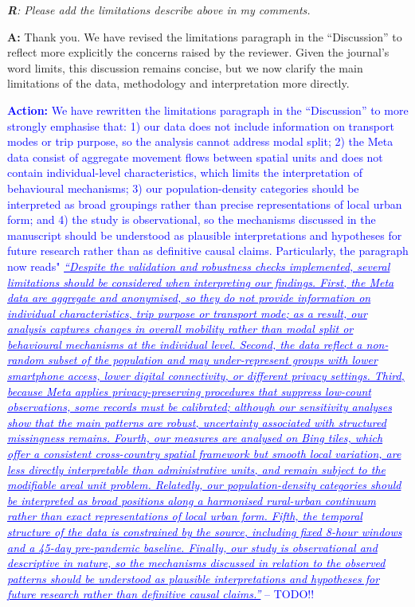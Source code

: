 \documentclass[12pt,a4paper,oneside, reqno]{amsart}
\begin{document}
\setlength{\leftskip}{1cm} \textit{\textbf{R}: Please add the limitations describe above in my comments.}

\setlength{\leftskip}{1cm}\textbf{A:} Thank you. We have revised the limitations paragraph in the ``Discussion'' to reflect more explicitly the concerns raised by the reviewer. Given the journal’s word limits, this discussion remains concise, but we now clarify the main limitations of the data, methodology and interpretation more directly.

\textcolor{blue}{\textbf{Action:} We have rewritten the limitations paragraph in the ``Discussion'' to more strongly emphasise that: 1) our data does not include information on transport modes or trip purpose, so the analysis cannot address modal split; 2) the Meta data consist of aggregate movement flows between spatial units and does not contain individual-level characteristics, which limits the interpretation of behavioural mechanisms; 3) our population-density categories should be interpreted as broad groupings rather than precise representations of local urban form; and 4) the study is observational, so the mechanisms discussed in the manuscript should be understood as plausible interpretations and hypotheses for future research rather than as definitive causal claims. Particularly, the paragraph now reads" \textit{\ul{``Despite the validation and robustness checks implemented, several limitations should be considered when interpreting our findings. First, the Meta data are aggregate and anonymised, so they do not provide information on individual characteristics, trip purpose or transport mode; as a result, our analysis captures changes in overall mobility rather than modal split or behavioural mechanisms at the individual level. Second, the data reflect a non-random subset of the population and may under-represent groups with lower smartphone access, lower digital connectivity, or different privacy settings. Third, because Meta applies privacy-preserving procedures that suppress low-count observations, some records must be calibrated; although our sensitivity analyses show that the main patterns are robust, uncertainty associated with structured missingness remains. Fourth, our measures are analysed on Bing tiles, which offer a consistent cross-country spatial framework but smooth local variation, are less directly interpretable than administrative units, and remain subject to the modifiable areal unit problem. Relatedly, our population-density categories should be interpreted as broad positions along a harmonised rural-urban continuum rather than exact representations of local urban form. Fifth, the temporal structure of the data is constrained by the source, including fixed 8-hour windows and a 45-day pre-pandemic baseline. Finally, our study is observational and descriptive in nature, so the mechanisms discussed in relation to the observed patterns should be understood as plausible interpretations and hypotheses for future research rather than definitive causal claims.''}} -- TODO!!}

\newpage

\clearpage
\pagestyle{plain}   
\printbibliography  
\end{document}

